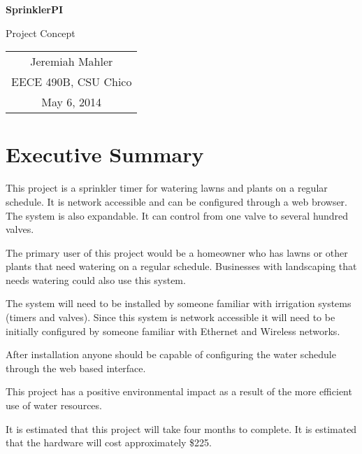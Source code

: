 \documentclass[12pt,letterpaper]{article}
\begin{document}
\vspace*{1.0in}

\centerline{\LARGE \textbf{SprinklerPI}}
\vspace{0.3in}
\centerline{\LARGE Project Concept}

\vfill

\begin{center}
\begin{tabular}{c}
Jeremiah Mahler \\
EECE 490B, CSU Chico \\
May 6, 2014
\end{tabular}
\end{center}

\vspace{2in}

\thispagestyle{empty}

\pagebreak

\tableofcontents
{}
\pagebreak

\pagebreak
\section{Executive Summary}

This project is a sprinkler timer for watering lawns and plants
on a regular schedule.
It is network accessible and can be configured through a web browser.
The system is also expandable.
It can control from one valve to several hundred valves.

The primary user of this project would be a homeowner who has
lawns or other plants that need watering on a regular schedule.
Businesses with landscaping that needs watering could also use
this system.

The system will need to be installed by someone familiar with
irrigation systems (timers and valves).
Since this system is network accessible it will need to be initially
configured by someone familiar with Ethernet and Wireless networks.

After installation anyone should be capable of configuring the
water schedule through the web based interface.

This project has a positive environmental impact as a result of the
more efficient use of water resources.

It is estimated that this project will take four months to complete.
It is estimated that the hardware will cost approximately \$225.
\end{document}
